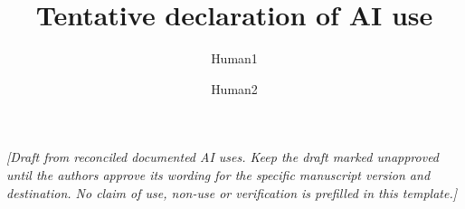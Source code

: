 \documentclass[a4paper,12pt,fleqn]{scrartcl}
\title{Tentative declaration of AI use}
\author{Human1 \and Human2}
\date{}
\begin{document}
\maketitle

\textit{[Draft from reconciled documented AI uses. Keep the draft marked
unapproved until the authors approve its wording for the specific manuscript
version and destination.
No claim of use, non-use or verification is prefilled in this template.]}
\end{document}
